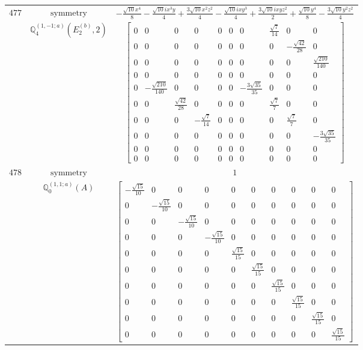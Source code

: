 \documentclass[fleqn,8pt,landscape]{jsarticle}
\begin{document}
\begin{longtable}{ccc}
$ 477 $ & $ \text{symmetry} $ & $ - \frac{\sqrt{10} x^{4}}{8} - \frac{\sqrt{10} i x^{3} y}{4} + \frac{3 \sqrt{10} x^{2} z^{2}}{4} - \frac{\sqrt{10} i x y^{3}}{4} + \frac{3 \sqrt{10} i x y z^{2}}{2} + \frac{\sqrt{10} y^{4}}{8} - \frac{3 \sqrt{10} y^{2} z^{2}}{4} $ \\
$  $ & $ \mathbb{Q}_{4}^{(1,-1;a)}(E_{2}^{(b)},2) $ & $ \begin{bmatrix} 0 & 0 & 0 & 0 & 0 & 0 & 0 & \frac{\sqrt{7}}{14} & 0 & 0 \\ 0 & 0 & 0 & 0 & 0 & 0 & 0 & 0 & - \frac{\sqrt{42}}{28} & 0 \\ 0 & 0 & 0 & 0 & 0 & 0 & 0 & 0 & 0 & \frac{\sqrt{210}}{140} \\ 0 & 0 & 0 & 0 & 0 & 0 & 0 & 0 & 0 & 0 \\ 0 & - \frac{\sqrt{210}}{140} & 0 & 0 & 0 & 0 & - \frac{3 \sqrt{35}}{35} & 0 & 0 & 0 \\ 0 & 0 & \frac{\sqrt{42}}{28} & 0 & 0 & 0 & 0 & \frac{\sqrt{7}}{7} & 0 & 0 \\ 0 & 0 & 0 & - \frac{\sqrt{7}}{14} & 0 & 0 & 0 & 0 & \frac{\sqrt{7}}{7} & 0 \\ 0 & 0 & 0 & 0 & 0 & 0 & 0 & 0 & 0 & - \frac{3 \sqrt{35}}{35} \\ 0 & 0 & 0 & 0 & 0 & 0 & 0 & 0 & 0 & 0 \\ 0 & 0 & 0 & 0 & 0 & 0 & 0 & 0 & 0 & 0 \end{bmatrix} $ \\ \hline
$ 478 $ & $ \text{symmetry} $ & $ 1 $ \\
$  $ & $ \mathbb{Q}_{0}^{(1,1;a)}(A) $ & $ \begin{bmatrix} - \frac{\sqrt{15}}{10} & 0 & 0 & 0 & 0 & 0 & 0 & 0 & 0 & 0 \\ 0 & - \frac{\sqrt{15}}{10} & 0 & 0 & 0 & 0 & 0 & 0 & 0 & 0 \\ 0 & 0 & - \frac{\sqrt{15}}{10} & 0 & 0 & 0 & 0 & 0 & 0 & 0 \\ 0 & 0 & 0 & - \frac{\sqrt{15}}{10} & 0 & 0 & 0 & 0 & 0 & 0 \\ 0 & 0 & 0 & 0 & \frac{\sqrt{15}}{15} & 0 & 0 & 0 & 0 & 0 \\ 0 & 0 & 0 & 0 & 0 & \frac{\sqrt{15}}{15} & 0 & 0 & 0 & 0 \\ 0 & 0 & 0 & 0 & 0 & 0 & \frac{\sqrt{15}}{15} & 0 & 0 & 0 \\ 0 & 0 & 0 & 0 & 0 & 0 & 0 & \frac{\sqrt{15}}{15} & 0 & 0 \\ 0 & 0 & 0 & 0 & 0 & 0 & 0 & 0 & \frac{\sqrt{15}}{15} & 0 \\ 0 & 0 & 0 & 0 & 0 & 0 & 0 & 0 & 0 & \frac{\sqrt{15}}{15} \end{bmatrix} $ \\ \hline

\end{longtable}
\end{document}
